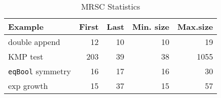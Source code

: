 \documentclass[submission,copyright,creativecommons]{eptcs}
\begin{document}
\begin{table}
  \centering
  \caption{MRSC Statistics}\label{tbl:Stats}
  \begin{tabular}{l|r|r|r|r}
    \hline
    Example                 & First & Last & Min. size & Max.size \\ \hline
    double append           &    12 &   10 &        10 &       19 \\
    KMP test                &   203 &   39 &        38 &     1055 \\
    \verb|eqBool| symmetry  &    16 &   17 &        16 &       30 \\
    exp growth              &    15 &   37 &        15 &       57 \\
  \end{tabular}
\end{table}
\end{document}
